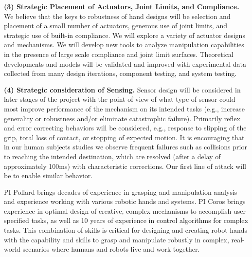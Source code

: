 \smallskip\noindent
{\bf (3) Strategic Placement of Actuators, Joint Limits, and Compliance.}  We believe that the keys to robustness of hand designs will be selection and placement of a small number of actuators, generous use of joint limits, and strategic use of built-in compliance.    We will explore a variety of actuator designs and mechanisms.   We will develop new tools to analyze manipulation capabilities in the presence of large scale compliance and joint limit surfaces.    Theoretical developments and models will be validated and improved with experimental data collected from many design iterations, component testing, and system testing. 

\smallskip\noindent
{\bf (4) Strategic consideration of Sensing.}    Sensor design will be considered in later stages of the project with the point of view of what type of sensor could most improve performance of the mechanism on its intended tasks (e.g., increase generality or robustness and/or eliminate catastrophic failure).  Primarily reflex and error correcting behaviors will be considered, e.g., response to slipping of the grip, total loss of contact, or stopping of expected motion.   It is encouraging that in our human subjects studies we observe frequent failures such as collisions prior to reaching the intended destination, which are resolved (after a delay of approximately 100ms) with characteristic corrections.   Our first line of attack will be to enable similar behavior.
	
PI Pollard brings decades of experience in grasping and manipulation analysis and experience working with various robotic hands and systems.   PI Coros brings experience in optimal design of creative, complex mechanisms to accomplish user specified tasks, as well as 10 years of experience in control algorithms for complex tasks.     This combination of skills is critical for designing and creating robot hands with the capability and skills to grasp and manipulate robustly in complex, real-world scenarios where humans and robots live and work together.

